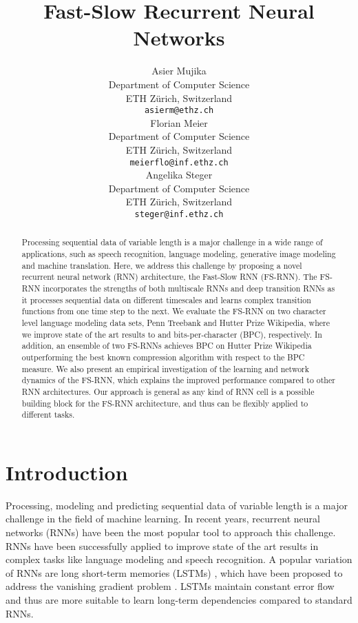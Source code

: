 \documentclass{article}
\title{Fast-Slow Recurrent Neural Networks}
\author{
  Asier Mujika\\
  Department of Computer Science\\
  ETH Zürich, Switzerland\\
  \texttt{asierm@ethz.ch} \\
  \And
  Florian Meier \\
  Department of Computer Science\\
  ETH Zürich, Switzerland\\
  \texttt{meierflo@inf.ethz.ch} \\
    \And
  Angelika Steger \\
  Department of Computer Science\\
  ETH Zürich, Switzerland\\
  \texttt{steger@inf.ethz.ch} \\
}
\begin{document}
\maketitle

\begin{abstract}



Processing sequential data of variable length is a major challenge in a wide range of applications, such as speech recognition, language modeling, generative image modeling and machine translation.
Here, we address this challenge by proposing a novel recurrent neural network (RNN) architecture, the Fast-Slow RNN (FS-RNN). The FS-RNN incorporates the strengths of both  multiscale RNNs and deep transition RNNs as it processes sequential data on different timescales  and learns complex transition functions from one time step to the next.  
We evaluate the FS-RNN on two character level language modeling data sets, Penn Treebank and Hutter Prize Wikipedia, where  we improve state of the art results to   and  bits-per-character (BPC), respectively. In addition, an ensemble of two FS-RNNs achieves  BPC on  Hutter Prize Wikipedia outperforming  the best known compression algorithm with respect to the BPC measure. We also present an empirical investigation of the learning and network dynamics of the FS-RNN, which explains the improved performance compared to other RNN architectures. Our approach is general as any kind of RNN cell is a possible building block for the FS-RNN architecture,  and thus can be flexibly applied to different tasks.
\end{abstract}



\section{Introduction}\label{sec:Introduction}
Processing, modeling and predicting sequential data of variable  length is a major challenge in the field of machine learning. In recent years, recurrent neural networks (RNNs) \cite{rumelhart1988learning,robinson1987utility, werbos1988generalization, williams1989complexity} have been the most popular tool to approach this challenge. RNNs have been successfully applied to improve state of the art results in complex tasks like language modeling and speech recognition. A popular variation of RNNs are long short-term memories (LSTMs) \cite{hochreiter1997long}, which have been proposed to address the vanishing gradient problem \cite{hochreiter1991untersuchungen, bengio1994learning, hochreiter1998vanishing}. LSTMs maintain constant error flow and thus are more suitable to learn long-term dependencies compared to standard RNNs.
\end{document}
